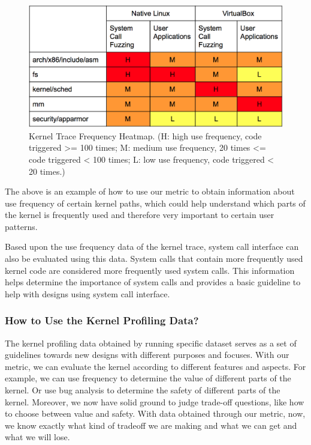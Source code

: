 \begin{figure}[h]
\centering
\includegraphics[width=1.0\columnwidth]{diagram/trace_frequency_heatmap.png}
\caption{Kernel Trace Frequency Heatmap. (H: high use frequency, code triggered >= 100 times; 
M: medium use frequency, 20 times <= code triggered < 100 times; L: low use frequency, code triggered < 20 times.)}
\label{fig:trace_frequency_heatmap}
\end{figure}

The above is an example of how to use our metric to obtain information about use frequency of certain kernel paths, 
which could help understand which parts of the kernel is frequently used and therefore very important to 
certain user patterns.

Based upon the use frequency data of the kernel trace, system call interface can also be evaluated using this data. 
System calls that contain more frequently used kernel code are considered more frequently used system calls. 
This information helps determine the importance of system calls and provides a basic guideline 
to help with designs using system call interface.

\subsubsection{How to Use the Kernel Profiling Data?}

The kernel profiling data obtained  by running specific dataset serves as a set of guidelines towards new designs 
with different purposes and focuses. With our metric, we can evaluate the kernel according to different features 
and aspects. For example, we can use frequency to determine the value of different parts of the kernel. Or use 
bug analysis to determine the safety of different parts of the kernel. Moreover, we now have solid ground to judge 
trade-off questions, like how to choose between value and safety. With data obtained through our metric, now, 
we know exactly what kind of tradeoff we are making and what we can get and what we will lose. 

